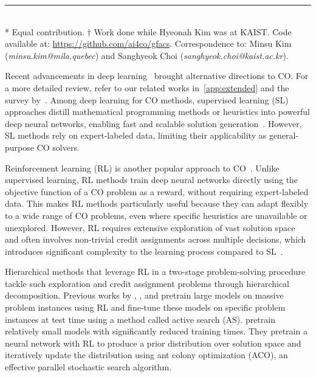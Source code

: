 \documentclass[twoside]{article}
\theoremstyle{plain}
\theoremstyle{definition}
\theoremstyle{remark}
\begin{document}
\begin{table}[b!]
\vspace*{-3.75ex}
\footnotesize
{}
\rule{0.8in}{0.4pt}\\[0.75ex]
* Equal contribution. $\dagger$ Work done while Hyeonah Kim was at KAIST. Code available at: \url{https://github.com/ai4co/gfacs}. Correspondence to: Minsu Kim (\textit{minsu.kim@mila.quebec}) and Sanghyeok Choi (\textit{sanghyeok.choi@kaist.ac.kr}).
\end{table}

Recent advancements in deep learning~\citep{lecun2015deep} brought alternative directions to CO. For a more detailed review, refer to our related works in~\cref{app:extended} and the survey by~\citet{bengio2021machine}. Among deep learning for CO methods, supervised learning (SL) approaches distill mathematical programming methods or heuristics into powerful deep neural networks, enabling fast and scalable solution generation~\citep{vinyals2015pointer, joshi2021learning, sun2023difusco, luo2023neural}. However, SL methods rely on expert-labeled data, limiting their applicability as general-purpose CO solvers.

Reinforcement learning (RL) is another popular approach to CO~\citep{khalil2017learning, kool2018attention, kwon2020pomo,ye2023deepaco}. 
Unlike supervised learning, RL methods train deep neural networks directly using the objective function of a CO problem as a reward, without requiring expert-labeled data. This makes RL methods particularly useful because they can adapt flexibly to a wide range of CO problems, even where specific heuristics are unavailable or unexplored. However, RL requires extensive exploration of vast solution space and often involves non-trivial credit assignments across multiple decisions, which introduces significant complexity to the learning process compared to SL~\citep{minsky1961steps}. 

Hierarchical methods that leverage RL in a two-stage problem-solving procedure tackle such exploration and credit assignment problems through hierarchical decomposition. Previous works by \citet{bello2016neural}, \citet{hottung2021efficient}, and \citet{son2023meta} pretrain large models on massive problem instances using RL and fine-tune these models on specific problem instances at test time using a method called active search (AS). \citet{ye2023deepaco} pretrain relatively small models with significantly reduced training times. 
They pretrain a neural network with RL to produce a prior distribution over solution space and iteratively update the distribution using ant colony optimization (ACO), an effective parallel stochastic search algorithm.
\end{document}
